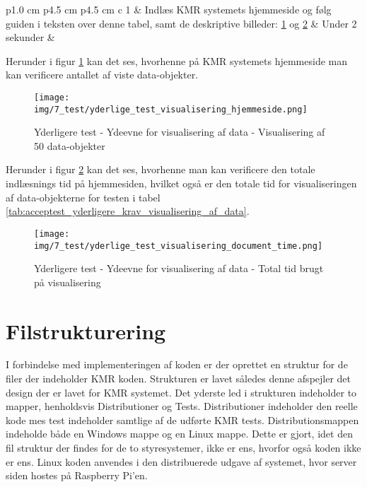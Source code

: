 \begin{appendices}
\begin{table}[H]
\begin{tabu}{ p{1.0 cm}  p{4.5 cm}   p{4.5 cm}   c  }
		1 & Indlæs KMR systemets hjemmeside og følg guiden i teksten over denne tabel, samt de deskriptive  billeder: \ref{fig:yderlige_test_ydeevne_visualisering_hjemmeside_50_objekter} og \ref{fig:yderlige_test_ydeevne_visualisering_document_time} &  Under 2 sekunder &  \\
		
	\end{tabu}
	\caption{Yderligere krav - Ydeevne for visualisering af data}
	\label{tab:acceptest_yderligere_krav_visualisering_af_data}
\end{table}

Herunder i figur \ref{fig:yderlige_test_ydeevne_visualisering_hjemmeside_50_objekter} kan det ses, hvorhenne på KMR systemets hjemmeside man kan verificere antallet af viste data-objekter.

\begin{figure}[H]
	\centering
	\texttt{[image: img/7\_test/yderlige\_test\_visualisering\_hjemmeside.png]}
	\caption[Test af krav 9.1 - Resultat]{Yderligere test - Ydeevne for visualisering af data - Visualisering af 50 data-objekter}
	\label{fig:yderlige_test_ydeevne_visualisering_hjemmeside_50_objekter}
\end{figure}

Herunder i figur \ref{fig:yderlige_test_ydeevne_visualisering_document_time} kan det ses, hvorhenne man kan verificere den totale indlæsnings tid på hjemmesiden, hvilket også er den totale tid for visualiseringen af data-objekterne for testen i tabel \ref{tab:acceptest_yderligere_krav_visualisering_af_data}.

\begin{figure}[H]
	\centering
	\texttt{[image: img/7\_test/yderlige\_test\_visualisering\_document\_time.png]}
	\caption[Test af krav 9.1 - Resultat (loadingtid)]{Yderligere test - Ydeevne for visualisering af data - Total tid brugt på visualisering}
	\label{fig:yderlige_test_ydeevne_visualisering_document_time}
\end{figure}

\chapter{Filstrukturering} \label{appendix::filstruktur}
I forbindelse med implementeringen af koden er der oprettet en struktur for de filer der indeholder KMR koden. Strukturen er lavet således denne afspejler det design der er lavet for KMR systemet. Det yderste led i strukturen indeholder to mapper, henholdsvis Distributioner og Tests. Distributioner indeholder den reelle kode mes test indeholder samtlige af de udførte KMR tests. Distributionsmappen indeholde både en Windows mappe og en Linux mappe. Dette er gjort, idet den fil struktur der findes for de to styresystemer, ikke er ens, hvorfor også koden ikke er ens. Linux koden anvendes i den distribuerede udgave af systemet, hvor server siden hostes på Raspberry Pi'en. 


\end{appendices}
